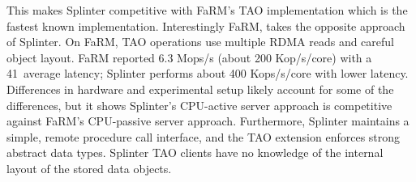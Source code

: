 This makes Splinter competitive with FaRM's TAO implementation which is the
  fastest known implementation.
Interestingly FaRM, takes the opposite approach of Splinter.
On FaRM, TAO operations use multiple RDMA reads and careful
  object layout.
FaRM reported 6.3 Mops/s (about 200 Kop/s/core) with a 41~\us average latency;
  Splinter performs about 400 Kops/s/core with lower latency.
Differences in hardware and experimental setup likely account for some
  of the differences, but it shows Splinter's CPU-active server approach
  is competitive against FaRM's CPU-passive server approach.
Furthermore, Splinter maintains a simple, remote procedure call interface, and
the TAO extension enforces strong abstract data types.
Splinter TAO clients have no knowledge of the internal layout of the stored
  data objects.
